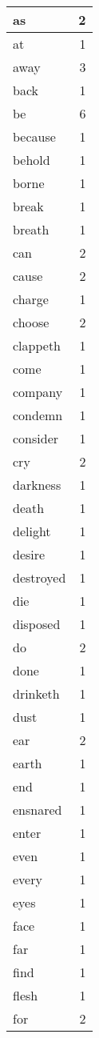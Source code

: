 \begin{center}
\begin{longtable}{l|r}
as & 2 \\ \hline
at & 1 \\ \hline
away & 3 \\ \hline
back & 1 \\ \hline
be & 6 \\ \hline
because & 1 \\ \hline
behold & 1 \\ \hline
borne & 1 \\ \hline
break & 1 \\ \hline
breath & 1 \\ \hline
can & 2 \\ \hline
cause & 2 \\ \hline
charge & 1 \\ \hline
choose & 2 \\ \hline
clappeth & 1 \\ \hline
come & 1 \\ \hline
company & 1 \\ \hline
condemn & 1 \\ \hline
consider & 1 \\ \hline
cry & 2 \\ \hline
darkness & 1 \\ \hline
death & 1 \\ \hline
delight & 1 \\ \hline
desire & 1 \\ \hline
destroyed & 1 \\ \hline
die & 1 \\ \hline
disposed & 1 \\ \hline
do & 2 \\ \hline
done & 1 \\ \hline
drinketh & 1 \\ \hline
dust & 1 \\ \hline
ear & 2 \\ \hline
earth & 1 \\ \hline
end & 1 \\ \hline
ensnared & 1 \\ \hline
enter & 1 \\ \hline
even & 1 \\ \hline
every & 1 \\ \hline
eyes & 1 \\ \hline
face & 1 \\ \hline
far & 1 \\ \hline
find & 1 \\ \hline
flesh & 1 \\ \hline
for & 2 \\ \hline

\end{longtable}
\end{center}
